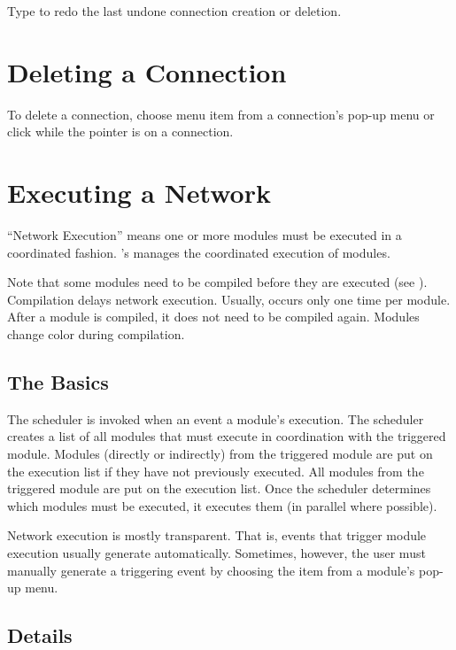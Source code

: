 Type  to redo the last undone connection creation or
deletion.
 
\section{Deleting a Connection}
\label{sec:deleteconnections}

To delete a connection, choose menu item  from a
connection's pop-up menu or click  while the
pointer is on a connection.

\section{Executing a Network}
\label{sec:executenet}

``Network Execution'' means one or more modules must be executed in a
coordinated fashion. 
\sr{}'s  manages the coordinated execution of modules.

Note that some modules need to be compiled before they are
executed (see ).  Compilation
delays network execution.  Usually, occurs only one time
per module.  After a module is compiled, it does not need to be
compiled again.  Modules change color during compilation.

\subsection{The Basics}

The scheduler is invoked when an event  a
module's execution.  The scheduler creates a list of all modules that
must execute in coordination with the triggered module. Modules
 (directly or indirectly) from the triggered module are 
put on the execution list if they have not previously executed.
All modules  from the triggered module are put
on the execution list.  Once the scheduler determines which modules must be
executed, it executes them (in parallel where possible).

Network execution is mostly transparent.  That is, events that trigger
module execution usually generate automatically. Sometimes,
however, the user must manually
generate a triggering event by choosing the  item from a
module's pop-up menu.

\subsection{Details}

